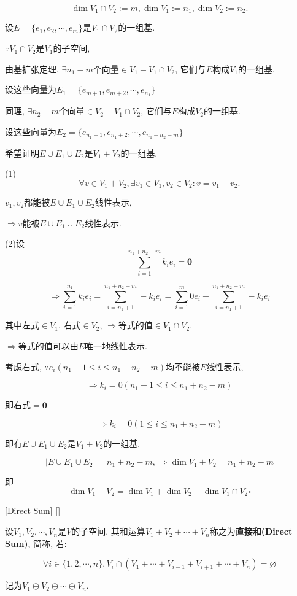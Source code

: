 \documentclass[UTF8]{ctexart}
\begin{document}
        \begin{prf}
			
			$$\dim V_1\cap V_2:=m, \dim V_{1}:=n_1, \dim V_{2}:=n_2. $$
			
			设$E=\{e_{1},e_{2},\cdots,e_{m}\}$是$V_1\cap V_2$的一组基. 
			
			$\because V_1\cap V_2$是$V_1$的子空间, 
			
			由基扩张定理, $\exists n_1-m$个向量$\in V_1-V_1\cap V_2$, 它们与$E$构成$V_1$的一组基. 
			
			设这些向量为$E_1=\{e_{m+1},e_{m+2},\cdots,e_{n_1}\}$
			
			同理, $\exists n_2-m$个向量$\in V_2-V_1\cap V_2$, 它们与$E$构成$V_2$的一组基. 
			
			设这些向量为$E_2=\{e_{n_1+1},e_{n_1+2},\cdots,e_{n_1+n_2-m}\}$
			
			希望证明$E\cup E_1\cup E_2$是$V_1+V_2$的一组基. 
			
			(1)$$\forall v\in V_1+V_2, \exists v_1\in V_1, v_2\in V_2: v=v_1+v_2. $$
			
			$v_1,v_2$都能被$E\cup E_1\cup E_2$线性表示, 
			
			$\Longrightarrow v$能被$E\cup E_1\cup E_2$线性表示. 
			
			(2)设$$\sum_{i=1}^{n_1+n_2-m}k_ie_i=\mathbf{0}$$
			
			$$\Longrightarrow\sum_{i=1}^{n_1}k_ie_i=\sum_{i=n_1+1}^{n_1+n_2-m}-k_ie_i=\sum_{i=1}^{m}0e_i+\sum_{i=n_1+1}^{n_1+n_2-m}-k_ie_i$$
			
			其中左式$\in V_1$, 右式$\in V_2$, $\Longrightarrow$等式的值$\in V_1\cap V_2$. 
			
			$\Longrightarrow$等式的值可以由$E$唯一地线性表示. 
			
			考虑右式, $\because e_i(n_1+1\leq i\leq n_1+n_2-m)$均不能被$E$线性表示,
			
			$$\Longrightarrow k_i=0(n_1+1\leq i\leq n_1+n_2-m)$$
			
			即右式$=\mathbf{0}$
			
			$$\Longrightarrow k_i=0(1\leq i\leq n_1+n_2-m)$$
			
			即有$E\cup E_1\cup E_2$是$V_1+V_2$的一组基. 
			
			$$|E\cup E_1\cup E_2|=n_1+n_2-m, \Longrightarrow\dim V_1+V_2=n_1+n_2-m$$
			
			即$$\dim V_{1}+V_{2}=\dim V_{1}+\dim V_{2}-\dim V_{1}\cap V_{2}\square$$
		\end{prf}
  
		\begin{dfn}
			[Direct-Sum]
			{}
			[Direct Sum]
			[]

			设$V_1,V_2,\cdots,V_n$是$V$的子空间. 其和运算$V_1+V_2+\cdots+V_n$称之为\textbf{直接和(Direct Sum)}, 简称\textbf{}, 若: 
			
			$$\forall i\in\{1,2,\cdots,n\}, V_i\cap(V_1+\cdots+V_{i-1}+V_{i+1}+\cdots+V_n)=\varnothing$$
			
			记为$V_1\oplus V_2\oplus\cdots\oplus V_n$. 
		\end{dfn}
		
\end{document}
